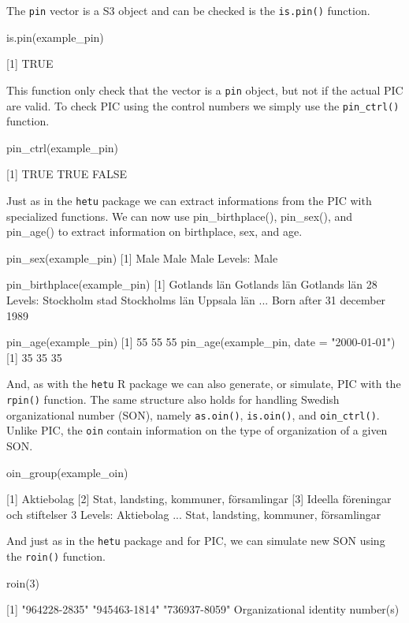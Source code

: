 The \texttt{pin} vector is a S3 object and can be checked is the \texttt{is.pin()} function.

\begin{example}
  is.pin(example_pin)

  [1] TRUE
\end{example}

This function only check that the vector is a \texttt{pin} object, but not if the actual PIC are valid. To check PIC using the control numbers we simply use the \texttt{pin_ctrl()} function.

\begin{example}
  pin_ctrl(example_pin)

  [1]  TRUE  TRUE FALSE
\end{example}

Just as in the \texttt{hetu} package we can extract informations from the PIC with specialized functions. We can now use pin_birthplace(), pin_sex(), and pin_age() to extract information on birthplace, sex, and age.

\begin{example}
  pin_sex(example_pin)
  [1] Male Male Male
  Levels: Male

  pin_birthplace(example_pin)
  [1] Gotlands län Gotlands län Gotlands län
  28 Levels: Stockholm stad Stockholms län Uppsala län ... Born after 31 december 1989

  pin_age(example_pin)
  [1] 55 55 55
  pin_age(example_pin, date = "2000-01-01")
  [1] 35 35 35
\end{example}

And, as with the \texttt{hetu} R package we can also generate, or simulate, PIC with the \texttt{rpin()} function. The same structure also holds for handling Swedish organizational number (SON), namely \texttt{as.oin()}, \texttt{is.oin()}, and \texttt{oin_ctrl()}. Unlike PIC, the \texttt{oin} contain information on the type of organization of a given SON.

\begin{example}
  oin_group(example_oin)

  [1] Aktiebolag
  [2] Stat, landsting, kommuner, församlingar
  [3] Ideella föreningar och stiftelser
  3 Levels: Aktiebolag ... Stat, landsting, kommuner, församlingar
\end{example}

And just as in the \texttt{hetu} package and for PIC, we can simulate new SON using the \texttt{roin()} function.

\begin{example}
  roin(3)

  [1] "964228-2835" "945463-1814" "736937-8059"
  Organizational identity number(s)
\end{example}



